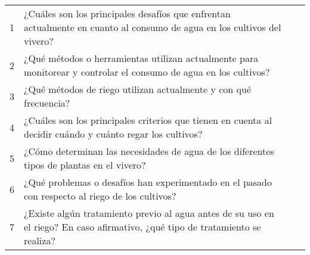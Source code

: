 \begin{longtable}{|l|p{6.5cm}|p{3.5cm}|p{3.5cm}|}
	1                                        & ¿Cuáles son los principales desafíos que enfrentan actualmente en cuanto al consumo de agua en los cultivos del vivero?        &                                         &                                           \\
	2                                        & ¿Qué métodos o herramientas utilizan actualmente para monitorear y controlar el consumo de agua en los cultivos?               &                                         &                                           \\
	3                                        & ¿Qué métodos de riego utilizan actualmente y con qué frecuencia?                                                               &                                         &                                           \\
	4                                        & ¿Cuáles son los principales criterios que tienen en cuenta al decidir cuándo y cuánto regar los cultivos?                      &                                         &                                           \\
	5                                        & ¿Cómo determinan las necesidades de agua de los diferentes tipos de plantas en el vivero?                                      &                                         &                                           \\
	6                                        & ¿Qué problemas o desafíos han experimentado en el pasado con respecto al riego de los cultivos?                                &                                         &                                           \\
	7                                        & ¿Existe algún tratamiento previo al agua antes de su uso en el riego? En caso afirmativo, ¿qué tipo de tratamiento se realiza? &                                         &                                           \\
\end{longtable}